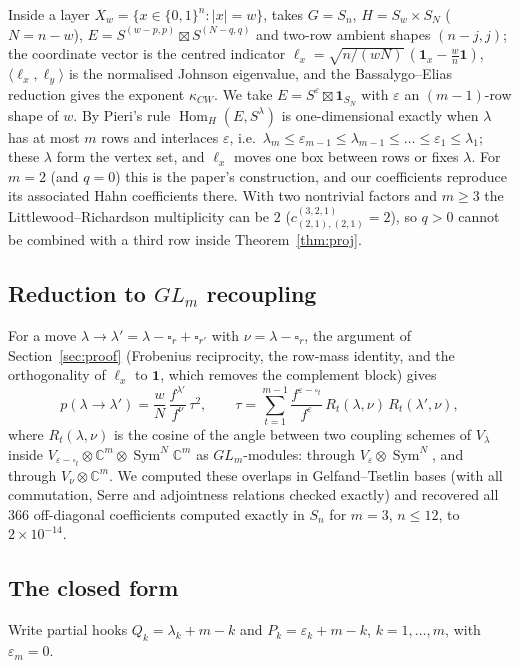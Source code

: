 \documentclass[11pt]{amsart}
\theoremstyle{definition}
\newcommand{\C}{\mathbb C}
\newcommand{\Hom}{\operatorname{Hom}}
\newcommand{\Sym}{\operatorname{Sym}}
\begin{document}
Inside a layer $X_w=\{x\in\{0,1\}^n:|x|=w\}$, \cite[\S3]{OAI2026} takes $G=S_n$, $H=S_w\times S_N$ ($N=n-w$), $E=S^{(w-p,p)}\boxtimes S^{(N-q,q)}$ and two-row ambient shapes $(n-j,j)$; the coordinate vector is the centred indicator $\ell_x=\sqrt{n/(wN)}\,(\mathbf1_x-\frac wn\mathbf1)$, $\langle\ell_x,\ell_y\rangle$ is the normalised Johnson eigenvalue, and the Bassalygo--Elias reduction gives the exponent $\kappa_{CW}$. We take $E=S^\varepsilon\boxtimes\mathbf1_{S_N}$ with $\varepsilon$ an $(m-1)$-row shape of $w$. By Pieri's rule $\Hom_H(E,S^\lambda)$ is one-dimensional exactly when $\lambda$ has at most $m$ rows and interlaces $\varepsilon$, i.e.\ $\lambda_m\le\varepsilon_{m-1}\le\lambda_{m-1}\le\dots\le\varepsilon_1\le\lambda_1$; these $\lambda$ form the vertex set, and $\ell_x$ moves one box between rows or fixes $\lambda$. For $m=2$ (and $q=0$) this is the paper's construction, and our coefficients reproduce its associated Hahn coefficients there. With two nontrivial factors and $m\ge3$ the Littlewood--Richardson multiplicity can be $2$ ($c^{(3,2,1)}_{(2,1),(2,1)}=2$), so $q>0$ cannot be combined with a third row inside Theorem~\ref{thm:proj}.

\subsection{Reduction to $GL_m$ recoupling}
For a move $\lambda\to\lambda'=\lambda-\square_r+\square_{r'}$ with $\nu=\lambda-\square_r$, the argument of Section~\ref{sec:proof} (Frobenius reciprocity, the row-mass identity, and the orthogonality of $\ell_x$ to $\mathbf1$, which removes the complement block) gives
\begin{equation}\label{eq:tau}
p(\lambda\to\lambda')=\frac wN\,\frac{f^{\lambda'}}{f^\nu}\,\tau^2,\qquad
\tau=\sum_{t=1}^{m-1}\frac{f^{\varepsilon-\square_t}}{f^\varepsilon}\,R_t(\lambda,\nu)\,R_t(\lambda',\nu),
\end{equation}
where $R_t(\lambda,\nu)$ is the cosine of the angle between two coupling schemes of $V_\lambda$ inside $V_{\varepsilon-\square_t}\otimes\C^m\otimes\Sym^N\C^m$ as $GL_m$-modules: through $V_\varepsilon\otimes\Sym^N$, and through $V_\nu\otimes\C^m$. We computed these overlaps in Gelfand--Tsetlin bases \cite{Molev} (with all commutation, Serre and adjointness relations checked exactly) and recovered all $366$ off-diagonal coefficients computed exactly in $S_n$ for $m=3$, $n\le12$, to $2\times10^{-14}$.

\subsection{The closed form}
Write partial hooks $Q_k=\lambda_k+m-k$ and $P_k=\varepsilon_k+m-k$, $k=1,\dots,m$, with $\varepsilon_m=0$.
\end{document}
